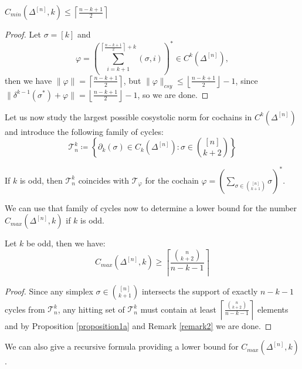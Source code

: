\begin{prop}\label{proposition231}
\(C_{min}(\Delta^{[n]},k)\leq\left\lceil\frac{n-k+1}{2}\right\rceil\)
\begin{proof}
Let \(\sigma=[k]\) and
\[
\varphi=\left(\sum\limits_{i=k+1}^{\left\lceil\frac{n-k+1}{2}\right\rceil+k}(\sigma,i)\right)^*\in C^k(\Delta^{[n]}),
\]
then we have \(\|\varphi\|=\left\lceil\frac{n-k+1}{2}\right\rceil\), but \(\|\varphi\|_{csy}\leq\left\lfloor\frac{n-k+1}{2}\right\rfloor-1\), since\\
\(\|\delta^{k-1}(\sigma^*)+\varphi\|=\left\lfloor\frac{n-k+1}{2}\right\rfloor-1\), so we are done.
\end{proof}
\end{prop}

Let us now study the largest possible cosystolic norm for cochains in \(C^k(\Delta^{[n]})\) and introduce the following family of cycles:
\[
\mathcal{T}_n^k\coloneqq \left\{\partial_k(\sigma)\in C_k(\Delta^{[n]}):\sigma\in\binom{[n]}{k+2}\right\}
\]

\begin{rem}\label{remark2}
If \(k\) is odd, then \(\mathcal{T}_n^k\) coincides with \(\mathcal{T}_{\varphi}\) for the cochain \(\varphi=\left(\sum\limits_{\sigma\in\binom{[n]}{k+1}}\sigma\right)^*\).
\end{rem}

We can use that family of cycles now to determine a lower bound for the number \(C_{max}(\Delta^{[n]},k)\) if \(k\) is odd.

\begin{prop}\label{proposition11}
Let \(k\) be odd, then we have:
\[
C_{max}(\Delta^{[n]},k)\geq \left\lceil\frac{\binom{n}{k+2}}{n-k-1}\right\rceil
\]
\begin{proof}
Since any simplex \(\sigma\in\binom{[n]}{k+1}\) intersects the support of exactly \(n-k-1\) cycles from \(\mathcal{T}_n^k\), any hitting set of \(\mathcal{T}_n^k\) must contain at least \(\left\lceil\frac{\binom{n}{k+2}}{n-k-1}\right\rceil\) elements and by Proposition \ref{proposition1a} and Remark \ref{remark2} we are done.
\end{proof}
\end{prop}

We can also give a recursive formula providing a lower bound for \(C_{max}(\Delta^{[n]},k)\).

